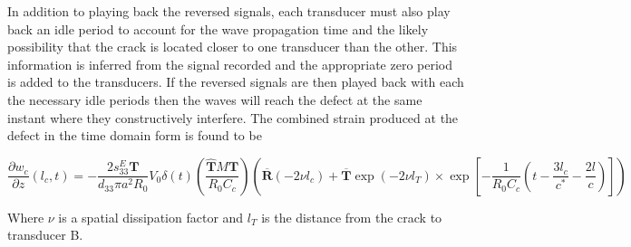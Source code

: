 

In addition to playing back the reversed signals, each transducer must also play back an idle period to account for the wave propagation time and the likely possibility that the crack is located closer to one transducer than the other. This information is inferred from the signal recorded and the appropriate zero period is added to the transducers. If the reversed signals are then played back with each the necessary idle periods then the waves will reach the defect at the same instant where they constructively interfere. The combined strain produced at the defect in the time domain form is found to be

\begin{equation}
\frac{\partial w_c}{\partial z}(l_c, t) = -\frac{2s^E_{33}\boldsymbol{T}}{d_{33} \pi a^2 R_0}V_0\delta (t) (\frac{\boldsymbol{\hat{T}}M \boldsymbol{T}}{R_0 C_c})(\overline{\boldsymbol{R}} (-2 \nu l_c) + \overline{\boldsymbol{T}} \exp(-2 \nu l_T) \times \exp [-\frac{1}{R_0 C_c} (t - \frac{3l_c}{c^*} - \frac{2l}{c})])
\end{equation}

Where $\nu$ is a spatial dissipation factor and $l_T$ is the distance from the crack to transducer B.

